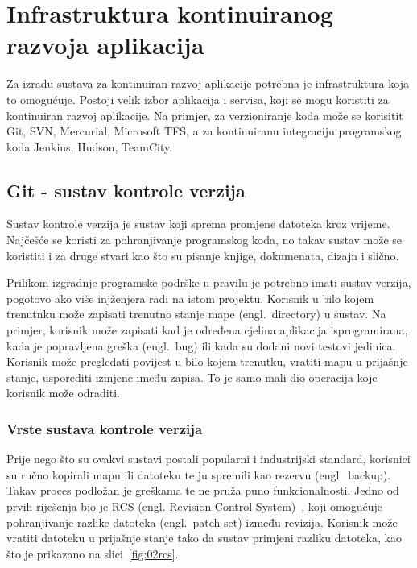 \chapter{Infrastruktura kontinuiranog razvoja aplikacija}
Za izradu sustava za kontinuiran razvoj aplikacije potrebna je infrastruktura koja to omogućuje.
Postoji velik izbor aplikacija i servisa, koji se mogu koristiti za kontinuiran razvoj aplikacije.
Na primjer, za verzioniranje koda može se korisitit Git, SVN, Mercurial, Microsoft TFS, a za
kontinuiranu integraciju programskog koda Jenkins, Hudson, TeamCity.

\section{Git - sustav kontrole verzija}
Sustav kontrole verzija je sustav koji sprema promjene datoteka kroz vrijeme. Najčešće se koristi za
pohranjivanje programskog koda, no takav sustav može se koristiti i za druge stvari kao što su
pisanje knjige, dokumenata, dizajn i slično.

Prilikom izgradnje programske podrške u pravilu je potrebno imati sustav verzija, pogotovo ako više
injženjera radi na istom projektu. Korisnik u bilo kojem trenutnku može zapisati trenutno stanje
mape (engl.~directory) u sustav. Na primjer, korisnik može zapisati kad je određena cjelina
aplikacija isprogramirana, kada je popravljena greška (engl.~bug) ili kada su dodani novi testovi
jedinica. Korisnik može pregledati povijest u bilo kojem trenutku, vratiti mapu u prijašnje stanje,
usporediti izmjene imeđu zapisa. To je samo mali dio operacija koje korisnik može odraditi.

\subsection{Vrste sustava kontrole verzija}
Prije nego što su ovakvi sustavi postali popularni i industrijski standard, korisnici su ručno
kopirali mapu ili datoteku te ju spremili kao rezervu (engl.~backup). Takav proces podložan je
greškama te ne pruža puno funkcionalnosti. Jedno od prvih riješenja bio je RCS (engl. Revision
Control System)~\citep{chacon2014pro}, koji omogućuje pohranjivanje razlike datoteka (engl.~patch
set) između revizija. Korisnik može vratiti datoteku u prijašnje stanje tako da sustav primjeni
razliku datoteka, kao što
je prikazano na slici~\ref{fig:02rcs}.

